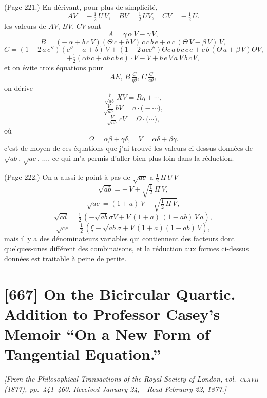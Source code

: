 \documentclass[11pt,a4paper]{article}
\theoremstyle{plain}
\theoremstyle{definition}
\begin{document}
\medskip

\noindent (Page 221.) En d\'erivant, pour plus de simplicit\'e,
\[
A V = -\,\tfrac{1}{2}\,U\,V,\quad B V = \tfrac{1}{2}\,U V,\quad C V = - \,\tfrac{1}{2}\,U.
\]
les valeurs de $A V$, $B V$, $C V$ sont
\[
A = \gamma\,\alpha\,V - \gamma\,V,
\]
\[
B = (-\,\alpha + b\,c\,V) (\Theta\,c + b\,V)\,c\,c\,b\,e + a\,c\,(\Theta\,V - \beta\,V)\,V,
\]
\[
C = (1 - 2\,a\,c'')(c'' - a + b)\,V + (1 - 2\,a c c'')\Theta c\,a\,b\,c\,c\,e + c\,b\,(\Theta\,a + \beta\,V)\Theta V,
\]
\[
+ \tfrac{1}{2}(\alpha b\,c + a b\,c\,b\,e) \cdot V - V + b\,e\,V\,a\,V\,b\,c\,V,
\]
et on \'evite trois \'equations pour
\[
A E,\,B\,\tfrac{C}{\eta\theta},\,C\,\tfrac{C}{a\theta},
\]
on d\'erive
\[
\tfrac{V}{\sqrt{a b}}\,X V = R\eta + \cdots,
\]
\[
\tfrac{V}{\sqrt{a b}}\,b V = a \cdot \big(- \cdots\big),
\]
\[
\tfrac{V}{\sqrt{a b}}\,c V = \Omega \cdot \big( \cdots \big),
\]
o\`u
\[
\Omega = \alpha\beta + \gamma\delta,\quad V = \alpha\delta + \beta\gamma.
\]
c'est de moyen de ces \'equations que j'ai trouv\'e les valeurs ci-dessus donn\'ees de $\sqrt{a b}$, $\sqrt{a c}$, $\ldots$, ce qui m'a permis d'aller bien plus loin dans la r\'eduction.

\medskip

\noindent (Page 222.) On a aussi le point \`a pas de $\sqrt{a c}$ a $\tfrac{1}{2}\,\Pi\,U\,V$
\[
\sqrt{a b} = -\,V + \sqrt{\tfrac{1}{2}}\,\Pi\,V,
\]
\[
\sqrt{a c} = (1 + a)\,V + \sqrt{\tfrac{1}{2}\,\Pi\,V},
\]
\[
\sqrt{c d} = \tfrac{1}{2}\,(- \sqrt{a b}\sigma V + V\,(1 + a)\,(1 - a b)\,V\,a),
\]
\[
\sqrt{c e} = \tfrac{1}{2}\,(\xi - \sqrt{a b}\sigma + V\,(1 + a) (1 - ab)\,V),
\]
mais il y a des d\'enominateurs variables qui contiennent des facteurs dont quelques-unes diff\'erent des combinaisons, et la r\'eduction aux formes ci-dessus donn\'ees est traitable \`a peine de petite.

\bigskip

\section{[667] On the Bicircular Quartic. Addition to Professor Casey's Memoir ``On a New Form of Tangential Equation.''}
\label{sec:667}

\noindent\textit{[From the \emph{Philosophical Transactions of the Royal Society of London}, vol.~\textsc{clxvii} (1877), pp.~441--460. Received January 24,---Read February 22, 1877.]}
\end{document}
